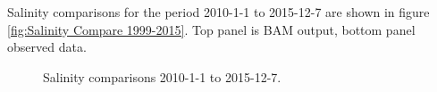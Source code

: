 Salinity comparisons for the period 2010-1-1 to 2015-12-7 are shown in figure \ref{fig:Salinity Compare 1999-2015}. Top panel is BAM output, bottom panel observed data.
\begin{figure}[H]

  \caption{Salinity comparisons 2010-1-1 to 2015-12-7.}
  \label{fig:Salinity Compare 2010-2015}
\end{figure}


